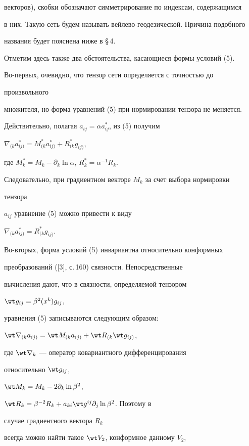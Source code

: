 векторов), скобки обозначают симметрирование по индексам, содержащимся 


в них. Такую сеть будем называть вейлево-геодезической. Причина подобного  


названия будет пояснена ниже в \S\,4. 


 


Отметим здесь также два обстоятельства, касающиеся формы условий (5). 


Во-первых, очевидно, что тензор сети определяется с точностью до


произвольного  


множителя, но форма уравнений (5) при нормировании тензора не меняется. 


Действительно, полагая $a_{ij}=\alpha a^*_{ij}$, из (5) получим 


$\nabla_{(k}a^*_{ij)}=M^*_{(k}a^*_{ij)}+R^*_{(k}g_{ij)}$, 


где $M^*_k=M_k-\partial_k\ln\alpha$, $R^*_k=\alpha^{-1}R_k$. 


Следовательно, при градиентном векторе $M_k$ за счет выбора нормировки


тензора 


$a_{ij}$ уравнение (5) можно привести к виду 


$\nabla_{(k}a^*_{ij)}=R^*_{(k}g_{ij)}$. 


 


Во-вторых, форма условий (5) инвариантна относительно конформных  


преобразований ([3], с.\,160) связности. Непосредственные 


вычисления дают, что в связности, определяемой тензором 


$\wt g_{ij}=\beta^2(x^k)g_{ij}$, 


уравнения (5) записываются следующим образом: 


$\wt\nabla_{(k}a_{ij)}=\wt M_{(k}a_{ij)}+\wt R_{(k}\wt g_{ij)}$, 


где $\wt\nabla_k$ --- оператор ковариантного дифференцирования 


относительно $\wt g_{ij}$, 


$\wt M_k=M_k-2\partial_k\ln\beta^2$, 


$\wt R_k=\beta^{-2}R_k+a_{ki}\wt g^{ij}\partial_j\ln\beta^2$. Поэтому в 


случае градиентного вектора $R_k$ 


всегда можно найти такое $\wt V_2$, конформное данному $V_2$, 



